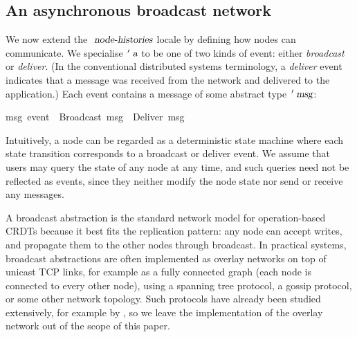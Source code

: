 \subsection{An asynchronous broadcast network}\label{sect.network.broadcast}

We now extend the $\isa{node-histories}$ locale by defining how nodes can communicate.
We specialise $\isacharprime\isa{a}$ to be one of two kinds of event: either \emph{broadcast} or \emph{deliver}.
(In the conventional distributed systems terminology, a \emph{deliver} event indicates that a message was received from the network and delivered to the application.)
Each event contains a message of some abstract type $\isacharprime\isa{msg}$:
\begin{isabelle}
 {\isacharprime}msg\ event\ {\isacharequal}\ Broadcast\ {\isacharprime}msg\ {\isacharbar}\ Deliver\ {\isacharprime}msg
\end{isabelle}

Intuitively, a node can be regarded as a deterministic state machine where each state transition corresponds to a broadcast or deliver event.
We assume that users may query the state of any node at any time, and such queries need not be reflected as events, since they neither modify the node state nor send or receive any messages.

A broadcast abstraction is the standard network model for operation-based CRDTs because it best fits the replication pattern: any node can accept writes, and propagate them to the other nodes through broadcast.
In practical systems, broadcast abstractions are often implemented as overlay networks on top of unicast TCP links, for example as a fully connected graph (each node is connected to every other node), using a spanning tree protocol, a gossip protocol, or some other network topology.
Such protocols have already been studied extensively, for example by \citet{Leitao:2007gq}, so we leave the implementation of the overlay network out of the scope of this paper.

